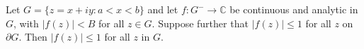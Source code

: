 Let $G = \{z = x+iy: a < x < b\}$ and let $f: G^- \to \mathbb{C}$ be continuous and analytic in $G$, with $|f(z)| < B$ for all $z \in G$. Suppose further that $|f(z)| \leq 1$ for all $z$ on $\partial G$. Then $|f(z)| \leq 1$ for all $z$ in $G$.
